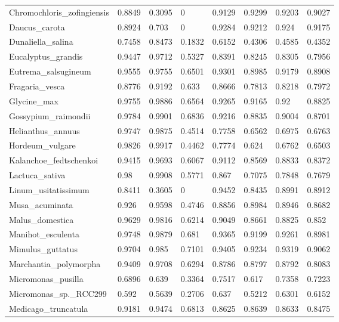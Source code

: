 \documentclass{article}
\begin{document}
\begin{table}[!h]
{\begin{tabular}{@{}llllllll@{}}
Chromochloris\_zofingiensis & 0.8849 & 0.3095 & 0 & 0.9129 & 0.9299 & 0.9203 & 0.9027 \\
Daucus\_carota & 0.8924 & 0.703 & 0 & 0.9284 & 0.9212 & 0.924 & 0.9175 \\
Dunaliella\_salina & 0.7458 & 0.8473 & 0.1832 & 0.6152 & 0.4306 & 0.4585 & 0.4352 \\
Eucalyptus\_grandis & 0.9447 & 0.9712 & 0.5327 & 0.8391 & 0.8245 & 0.8305 & 0.7956 \\
Eutrema\_salsugineum & 0.9555 & 0.9755 & 0.6501 & 0.9301 & 0.8985 & 0.9179 & 0.8908 \\
Fragaria\_vesca & 0.8776 & 0.9192 & 0.633 & 0.8666 & 0.7813 & 0.8218 & 0.7972 \\
Glycine\_max & 0.9755 & 0.9886 & 0.6564 & 0.9265 & 0.9165 & 0.92 & 0.8825 \\
Gossypium\_raimondii & 0.9784 & 0.9901 & 0.6836 & 0.9216 & 0.8835 & 0.9004 & 0.8701 \\
Helianthus\_annuus & 0.9747 & 0.9875 & 0.4514 & 0.7758 & 0.6562 & 0.6975 & 0.6763 \\
Hordeum\_vulgare & 0.9826 & 0.9917 & 0.4462 & 0.7774 & 0.624 & 0.6762 & 0.6503 \\
Kalanchoe\_fedtschenkoi & 0.9415 & 0.9693 & 0.6067 & 0.9112 & 0.8569 & 0.8833 & 0.8372 \\
Lactuca\_sativa & 0.98 & 0.9908 & 0.5771 & 0.867 & 0.7075 & 0.7848 & 0.7679 \\
Linum\_usitatissimum & 0.8411 & 0.3605 & 0 & 0.9452 & 0.8435 & 0.8991 & 0.8912 \\
Musa\_acuminata & 0.926 & 0.9598 & 0.4746 & 0.8856 & 0.8984 & 0.8946 & 0.8682 \\
Malus\_domestica & 0.9629 & 0.9816 & 0.6214 & 0.9049 & 0.8661 & 0.8825 & 0.852 \\
Manihot\_esculenta & 0.9748 & 0.9879 & 0.681 & 0.9365 & 0.9199 & 0.9261 & 0.8981 \\
Mimulus\_guttatus & 0.9704 & 0.985 & 0.7101 & 0.9405 & 0.9234 & 0.9319 & 0.9062 \\
Marchantia\_polymorpha & 0.9409 & 0.9708 & 0.6294 & 0.8786 & 0.8797 & 0.8792 & 0.8083 \\
Micromonas\_pusilla & 0.6896 & 0.639 & 0.3364 & 0.7517 & 0.617 & 0.7358 & 0.7223 \\
Micromonas\_sp.\_RCC299 & 0.592 & 0.5639 & 0.2706 & 0.637 & 0.5212 & 0.6301 & 0.6152 \\
Medicago\_truncatula & 0.9181 & 0.9474 & 0.6813 & 0.8625 & 0.8639 & 0.8633 & 0.8475 \\

\end{tabular}}
\end{table}
\end{document}
